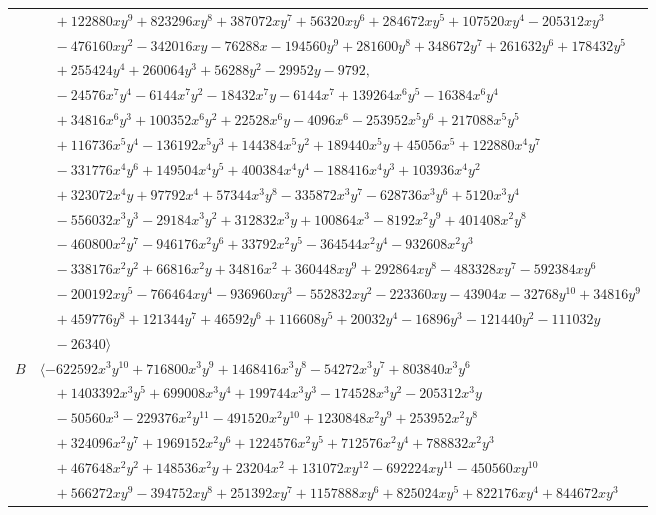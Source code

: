 \documentclass[11pt]{article}
\begin{document}
\begin{longtable}{@{}ll@{}}
 & $\quad +122880xy^{9}+823296xy^{8}+387072xy^{7}+56320xy^{6}+284672xy^{5}+107520xy^{4}-205312xy^{3}$\\
 & $\quad -476160xy^{2}-342016xy-76288x-194560y^{9}+281600y^{8}+348672y^{7}+261632y^{6}+178432y^{5}$\\
 & $\quad +255424y^{4}+260064y^{3}+56288y^{2}-29952y-9792,$\\
 & $\quad -24576x^{7}y^{4}-6144x^{7}y^{2}-18432x^{7}y-6144x^{7}+139264x^{6}y^{5}-16384x^{6}y^{4}$\\
 & $\quad +34816x^{6}y^{3}+100352x^{6}y^{2}+22528x^{6}y-4096x^{6}-253952x^{5}y^{6}+217088x^{5}y^{5}$\\
 & $\quad +116736x^{5}y^{4}-136192x^{5}y^{3}+144384x^{5}y^{2}+189440x^{5}y+45056x^{5}+122880x^{4}y^{7}$\\
 & $\quad -331776x^{4}y^{6}+149504x^{4}y^{5}+400384x^{4}y^{4}-188416x^{4}y^{3}+103936x^{4}y^{2}$\\
 & $\quad +323072x^{4}y+97792x^{4}+57344x^{3}y^{8}-335872x^{3}y^{7}-628736x^{3}y^{6}+5120x^{3}y^{4}$\\
 & $\quad -556032x^{3}y^{3}-29184x^{3}y^{2}+312832x^{3}y+100864x^{3}-8192x^{2}y^{9}+401408x^{2}y^{8}$\\
 & $\quad -460800x^{2}y^{7}-946176x^{2}y^{6}+33792x^{2}y^{5}-364544x^{2}y^{4}-932608x^{2}y^{3}$\\
 & $\quad -338176x^{2}y^{2}+66816x^{2}y+34816x^{2}+360448xy^{9}+292864xy^{8}-483328xy^{7}-592384xy^{6}$\\
 & $\quad -200192xy^{5}-766464xy^{4}-936960xy^{3}-552832xy^{2}-223360xy-43904x-32768y^{10}+34816y^{9}$\\
 & $\quad +459776y^{8}+121344y^{7}+46592y^{6}+116608y^{5}+20032y^{4}-16896y^{3}-121440y^{2}-111032y$\\
 & $\quad -26340\rangle$\\
$B$ & $\langle -622592x^{3}y^{10}+716800x^{3}y^{9}+1468416x^{3}y^{8}-54272x^{3}y^{7}+803840x^{3}y^{6}$\\
 & $\quad +1403392x^{3}y^{5}+699008x^{3}y^{4}+199744x^{3}y^{3}-174528x^{3}y^{2}-205312x^{3}y$\\
 & $\quad -50560x^{3}-229376x^{2}y^{11}-491520x^{2}y^{10}+1230848x^{2}y^{9}+253952x^{2}y^{8}$\\
 & $\quad +324096x^{2}y^{7}+1969152x^{2}y^{6}+1224576x^{2}y^{5}+712576x^{2}y^{4}+788832x^{2}y^{3}$\\
 & $\quad +467648x^{2}y^{2}+148536x^{2}y+23204x^{2}+131072xy^{12}-692224xy^{11}-450560xy^{10}$\\
 & $\quad +566272xy^{9}-394752xy^{8}+251392xy^{7}+1157888xy^{6}+825024xy^{5}+822176xy^{4}+844672xy^{3}$\\

\end{longtable}
\end{document}
